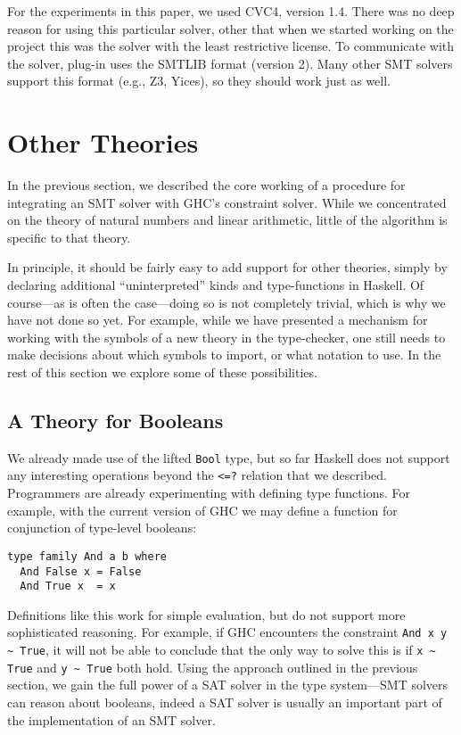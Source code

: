\documentclass{sigplanconf}
\begin{document}
For the experiments in this paper, we used CVC4, version 1.4.  There was
no deep reason for using this particular solver, other that when we started
working on the project this was the solver with the least restrictive license.
To communicate with the solver, plug-in uses the SMTLIB format (version 2).
Many other SMT solvers support this format (e.g., Z3, Yices), so they
should work just as well.



\section{Other Theories}
\label{other}

In the previous section, we described the core working of a procedure
for integrating an SMT solver with GHC's constraint solver.  While
we concentrated on the theory of natural numbers and linear arithmetic,
little of the algorithm is specific to that theory.

In principle, it should be fairly easy to add support for other theories,
simply by declaring additional ``uninterpreted'' kinds and type-functions
in Haskell.  Of course---as is often the case---doing so is not completely
trivial, which is why we have not done so yet.  For example, while we
have presented a mechanism for working with the symbols of a new theory
in the type-checker, one still needs to make decisions about which symbols
to import, or what notation to use.  In the rest of this section we
explore some of these possibilities.

\subsection{A Theory for Booleans}
We already made use of the lifted \Verb"Bool" type, but so far Haskell
does not support any interesting operations beyond the \Verb"<=?" relation
that we described.  Programmers are already experimenting with defining
type functions. For example, with the current version of GHC we may
define a function for conjunction of type-level booleans:
\begin{Verbatim}
type family And a b where
  And False x = False
  And True x  = x
\end{Verbatim}

Definitions like this work for simple evaluation, but do not support
more sophisticated reasoning.  For example, if GHC encounters
the constraint \Verb"And x y ~ True", it will not be able to conclude
that the only way to solve this is if \Verb"x ~ True" and \Verb"y ~ True"
both hold.  Using the approach outlined in the previous section, we
gain the full power of a SAT solver in the type system---SMT solvers
can reason about booleans, indeed a SAT solver is usually an important
part of the implementation of an SMT solver.
\end{document}
